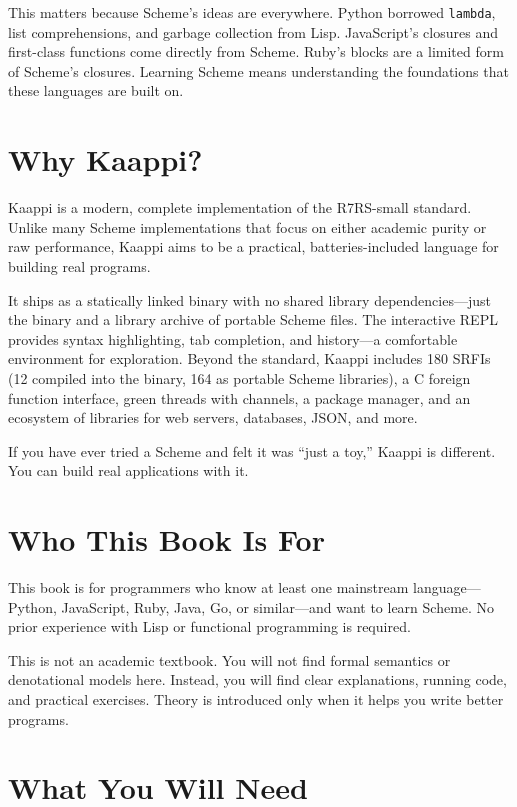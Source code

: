 \documentclass[11pt,twoside,openright]{memoir}
\newcommand{\srfitotal}{180}
\newcommand{\srfibuiltin}{12}
\newcommand{\srfiportable}{164}
\begin{document}
This matters because Scheme's ideas are everywhere. Python borrowed \texttt{lambda}, list comprehensions, and garbage collection from Lisp. JavaScript's closures and first-class functions come directly from Scheme. Ruby's blocks are a limited form of Scheme's closures. Learning Scheme means understanding the foundations that these languages are built on.

\section*{Why Kaappi?}

Kaappi is a modern, complete implementation of the R7RS-small standard. Unlike many Scheme implementations that focus on either academic purity or raw performance, Kaappi aims to be a practical, batteries-included language for building real programs.

It ships as a statically linked binary with no shared library dependencies---just the binary and a library archive of portable Scheme files. The interactive REPL provides syntax highlighting, tab completion, and history---a comfortable environment for exploration. Beyond the standard, Kaappi includes \srfitotal{} SRFIs (\srfibuiltin{} compiled into the binary, \srfiportable{} as portable Scheme libraries), a C foreign function interface, green threads with channels, a package manager, and an ecosystem of libraries for web servers, databases, JSON, and more.

If you have ever tried a Scheme and felt it was ``just a toy,'' Kaappi is different. You can build real applications with it.

\section*{Who This Book Is For}

This book is for programmers who know at least one mainstream language---Python, JavaScript, Ruby, Java, Go, or similar---and want to learn Scheme. No prior experience with Lisp or functional programming is required.

This is not an academic textbook. You will not find formal semantics or denotational models here. Instead, you will find clear explanations, running code, and practical exercises. Theory is introduced only when it helps you write better programs.

\section*{What You Will Need}
\end{document}
